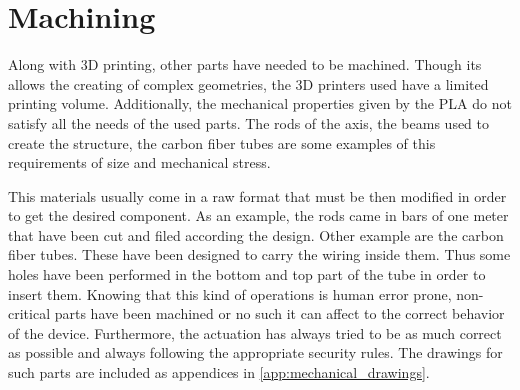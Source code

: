 \section{Machining} %
\label{sec:machining}
Along with 3D printing, other parts have needed to be machined.
Though its allows the creating of complex geometries, the 3D printers used have a limited printing volume.
Additionally, the mechanical properties given by the PLA do not satisfy all the needs of the used parts.
The rods of the axis, the beams used to create the structure, the carbon fiber tubes are some examples of this requirements of size and mechanical stress.


This materials usually come in a raw format that must be then modified in order to get the desired component.
As an example, the rods came in bars of one meter that have been cut and filed according the design.
Other example are the carbon fiber tubes.
These have been designed to carry the wiring inside them.
Thus some holes have been performed in the bottom and top part of the tube in order to insert them.
Knowing that this kind of operations is human error prone, non-critical parts have been machined or no such it can affect to the correct behavior of the device.
Furthermore, the actuation has always tried to be as much correct as possible and always following the appropriate security rules.
The drawings for such parts are included as appendices in \ref{app:mechanical_drawings}.

